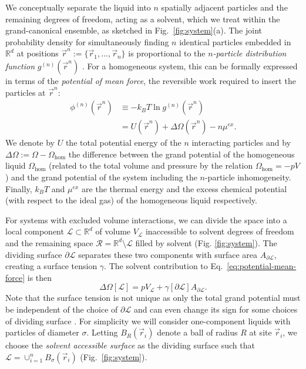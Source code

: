 \documentclass[11pt,twoside]{report}
\begin{document}
We conceptually separate the liquid into $n$ spatially adjacent particles and the remaining degrees of freedom, acting as a solvent, which we treat within the grand-canonical ensemble, as sketched in Fig.\ \ref{fig:system}(a).
The joint probability density for simultaneously finding $n$ identical particles embedded in $\mathbb{R}^d$ at positions $\vec{r}^n := \{\vec{r}_1, \dots, \vec{r}_n\}$  is proportional to the \emph{$n$-particle distribution function} $g^{(n)}(\vec{r}^n)$ \cite{Hansen2013}.
For a homogeneous system, this can be formally expressed in terms of the \emph{potential of mean force}, the reversible work required to insert the particles at $\vec{r}^n$:
\begin{equation}\label{eq:potential-mean-force}
  \begin{split}
    \phi^{(n)}(\vec{r}^n) &\equiv - k_B T \ln g^{(n)}(\vec{r}^n) \\
    &= U(\vec{r}^n) + \Delta \Omega(\vec{r}^n) - n\mu^{ex}.
  \end{split}
\end{equation}
We denote by $U$ the total potential energy of the $n$ interacting particles and by $\Delta\Omega := \Omega - \Omega_\textrm{hom}$ the difference between the grand potential of the homogeneous liquid $\Omega_\textrm{hom}$ (related to the total volume and pressure by the relation $\Omega_\textrm{hom} = -pV$) and the grand potential of the system including the $n$-particle inhomogeneity.
Finally, $k_B T$ and $\mu^{ex}$ are the thermal energy and the excess chemical potential (with respect to the ideal gas) of the homogeneous liquid respectively.

For systems with excluded volume interactions, we can divide the space into a local component $\mathcal{L} \subset \mathbb{R}^d$ of volume $V_\mathcal{L}$ inaccessible to solvent degrees of freedom and the remaining space $\mathcal{R} = \mathbb{R}^d \setminus \mathcal{L}$ filled by solvent (Fig. \ref{fig:system}).
The dividing surface $\partial\mathcal{L}$ separates these two components with surface area $A_{\partial\mathcal{L}}$, creating a surface tension $\gamma$.
The solvent contribution to Eq.\ \eqref{eq:potential-mean-force} is then \begin{equation}\label{eq:surface-tension}
  \Delta \Omega[\mathcal{L}] =
  p V_\mathcal{L} + \gamma[{\partial\mathcal{L}}] A_{\partial\mathcal{L}}.
\end{equation}
Note that the surface tension is not unique as only the total grand potential must be independent of the choice of $\partial\mathcal{L}$ and can even change its sign for some choices of dividing surface \cite{BrykPRE2003}.
For simplicity we will consider one-component liquids with particles of diameter $\sigma$.
Letting $B_R(\vec{r}_i)$ denote a ball of radius $R$ at site $\vec{r}_i$, we choose the \emph{solvent accessible surface} \cite{LeeJMB1971} as the dividing surface such that $\mathcal{L} = \cup_{i=1}^n B_\sigma(\vec{r}_i)$ (Fig.\ \ref{fig:system}).
\end{document}
